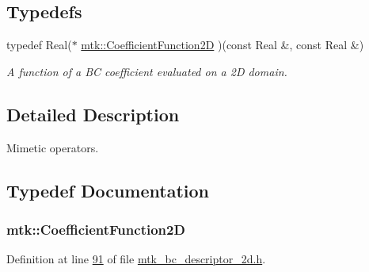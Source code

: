 \subsection*{Typedefs}
\begin{DoxyCompactItemize}
\item 
typedef Real($\ast$ \hyperlink{group__c07-mim__ops_gad9e1c0ace886b0029aefffa5f320e852}{mtk\+::\+Coefficient\+Function2\+D} )(const Real \&, const Real \&)
\begin{DoxyCompactList}\small\item\em A function of a B\+C coefficient evaluated on a 2\+D domain. \end{DoxyCompactList}\end{DoxyCompactItemize}


\subsection{Detailed Description}
Mimetic operators. 

\subsection{Typedef Documentation}
\hypertarget{group__c07-mim__ops_gad9e1c0ace886b0029aefffa5f320e852}{
\subsubsection[{Coefficient\+Function2\+D}]{\setlength{\rightskip}{0pt plus 5cm}mtk\+::\+Coefficient\+Function2\+D}}\label{group__c07-mim__ops_gad9e1c0ace886b0029aefffa5f320e852}


Definition at line \hyperlink{mtk__bc__descriptor__2d_8h_source_l00091}{91} of file \hyperlink{mtk__bc__descriptor__2d_8h_source}{mtk\+\_\+bc\+\_\+descriptor\+\_\+2d.\+h}.

